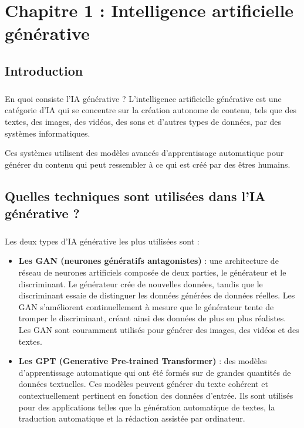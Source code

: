 \chapter{Chapitre 1 : Intelligence artificielle générative}
\section*{Introduction}
\paragraph{}
En quoi consiste l’IA générative ?
L'intelligence artificielle générative est une catégorie d'IA qui se concentre sur la création autonome de contenu, tels que des textes, des images, des vidéos, des sons et d'autres types de données, par des systèmes informatiques.

Ces systèmes utilisent des modèles avancés d'apprentissage automatique pour générer du contenu qui peut ressembler à ce qui est créé par des êtres humains.
        \section{Quelles techniques sont utilisées dans l’IA générative ?}
        \paragraph{}
        Les deux types d'IA générative les plus utilisées sont :

        \begin{itemize}
            \item \textbf{Les GAN (neurones génératifs antagonistes)} : une architecture de réseau de neurones artificiels composée de deux parties, le générateur et le discriminant. Le générateur crée de nouvelles données, tandis que le discriminant essaie de distinguer les données générées de données réelles. Les GAN s'améliorent continuellement à mesure que le générateur tente de tromper le discriminant, créant ainsi des données de plus en plus réalistes. Les GAN sont couramment utilisés pour générer des images, des vidéos et des textes.

            \item \textbf{Les GPT (Generative Pre-trained Transformer)} : des modèles d'apprentissage automatique qui ont été formés sur de grandes quantités de données textuelles. Ces modèles peuvent générer du texte cohérent et contextuellement pertinent en fonction des données d'entrée. Ils sont utilisés pour des applications telles que la génération automatique de textes, la traduction automatique et la rédaction assistée par ordinateur.
        \end{itemize}
